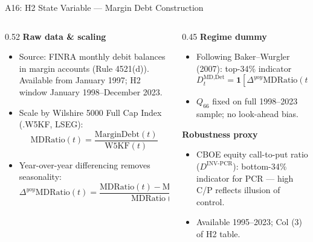 \documentclass[10pt, aspectratio=169]{beamer}
\begin{document}
\begin{frame}{A16: H2 State Variable — Margin Debt Construction}
  \begin{columns}[T]
    \begin{column}{0.52\textwidth}
      \small\textbf{Raw data \& scaling}
      \begin{itemize}\itemsep2pt
        \item Source: FINRA monthly debit balances in margin accounts (Rule 4521(d)).
              Available from January 1997; H2 window January 1998--December 2023.
        \item Scale by Wilshire 5000 Full Cap Index (.W5KF, LSEG):
              \[
                \text{MDRatio}(t) = \frac{\text{MarginDebt}(t)}{\text{W5KF}(t)}
              \]
        \item Year-over-year differencing removes seasonality:
              \[
                \Delta^{yoy}\text{MDRatio}(t) = \frac{\text{MDRatio}(t) - \text{MDRatio}(t-12)}{\text{MDRatio}(t-12)}
              \]
      \end{itemize}
    \end{column}
    \begin{column}{0.45\textwidth}
      \small\textbf{Regime dummy}
      \begin{itemize}\itemsep2pt
        \item Following Baker--Wurgler (2007): top-34\% indicator
              \[
                D^{\text{MD,Det}}_t = \mathbf{1}\!\left[\Delta^{yoy}\text{MDRatio}(t) > Q_{66}\right]
              \]
        \item $Q_{66}$ fixed on full 1998--2023 sample; no look-ahead bias.
      \end{itemize}
      \vspace{3pt}
      \small\textbf{Robustness proxy}
      \begin{itemize}\itemsep2pt
        \item CBOE equity call-to-put ratio ($D^{\text{INV-PCR}}$): bottom-34\% indicator for PCR — high C/P reflects illusion of control.
        \item Available 1995--2023; Col (3) of H2 table.
      \end{itemize}
    \end{column}
  \end{columns}
\end{frame}
\end{document}
